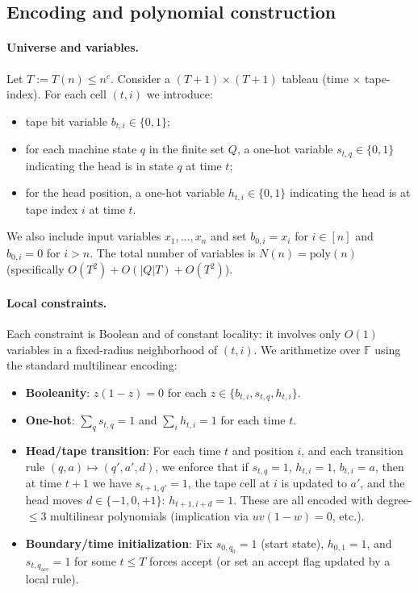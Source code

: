 \documentclass[12pt]{article}
\theoremstyle{definition}
\theoremstyle{definition}
\theoremstyle{remark}
\theoremstyle{remark}
\begin{document}
\subsection{Encoding and polynomial construction}

\paragraph{Universe and variables.}
Let $T := T(n) \leq n^c$. Consider a $(T+1) \times (T+1)$ tableau (time $\times$ tape-index). For each cell $(t,i)$ we introduce:
\begin{itemize}
\item tape bit variable $b_{t,i} \in \{0,1\}$;
\item for each machine state $q$ in the finite set $Q$, a one-hot variable $s_{t,q} \in \{0,1\}$ indicating the head is in state $q$ at time $t$;
\item for the head position, a one-hot variable $h_{t,i} \in \{0,1\}$ indicating the head is at tape index $i$ at time $t$.
\end{itemize}
We also include input variables $x_1, \ldots, x_n$ and set $b_{0,i} = x_i$ for $i \in [n]$ and $b_{0,i} = 0$ for $i > n$. The total number of variables is $N(n) = \mathrm{poly}(n)$ (specifically $O(T^2) + O(|Q|T) + O(T^2)$).

\paragraph{Local constraints.}
Each constraint is Boolean and of constant locality: it involves only $O(1)$ variables in a fixed-radius neighborhood of $(t,i)$. We arithmetize over $\mathbb{F}$ using the standard multilinear encoding:
\begin{itemize}
\item \textbf{Booleanity}: $z(1-z) = 0$ for each $z \in \{b_{t,i}, s_{t,q}, h_{t,i}\}$.
\item \textbf{One-hot}: $\sum_q s_{t,q} = 1$ and $\sum_i h_{t,i} = 1$ for each time $t$.
\item \textbf{Head/tape transition}: For each time $t$ and position $i$, and each transition rule $(q,a) \mapsto (q',a',d)$, we enforce that if $s_{t,q} = 1$, $h_{t,i} = 1$, $b_{t,i} = a$, then at time $t+1$ we have $s_{t+1,q'} = 1$, the tape cell at $i$ is updated to $a'$, and the head moves $d \in \{-1, 0, +1\}$: $h_{t+1,i+d} = 1$. These are all encoded with degree-$\leq 3$ multilinear polynomials (implication via $uv(1-w) = 0$, etc.).
\item \textbf{Boundary/time initialization}: Fix $s_{0,q_0} = 1$ (start state), $h_{0,1} = 1$, and $s_{t,q_{\mathrm{acc}}} = 1$ for some $t \leq T$ forces accept (or set an accept flag updated by a local rule).
\end{itemize}
\end{document}
